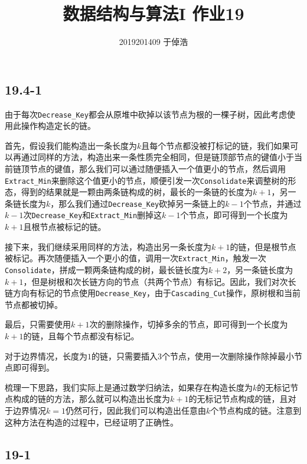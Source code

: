 \documentclass[]{article}
\title{数据结构与算法I 作业19}
\author{2019201409 于倬浩}
\begin{document}
\maketitle

\hypertarget{header-n4}{%
\subsection{19.4-1}\label{header-n4}}

由于每次\texttt{Decrease\_Key}都会从原堆中砍掉以该节点为根的一棵子树，因此考虑使用此操作构造定长的链。

首先，假设我们能构造出一条长度为\(k\)且每个节点都没被打标记的链，我们如果可以再通过同样的方法，构造出来一条性质完全相同，但是链顶部节点的键值小于当前链顶节点的键值，那么我们可以通过随便插入一个值更小的节点，然后调用\texttt{Extract\_Min}来删除这个值更小的节点，顺便引发一次\texttt{Consolidate}来调整树的形态，得到的结果就是一颗由两条链构成的树，最长的一条链的长度为\(k+1\)，另一条链长度为\(k\)，那么我们通过\texttt{Decrease\_Key}砍掉另一条链上的\(k-1\)个节点，并通过\(k-1\)次\texttt{Decrease\_Key}和\texttt{Extract\_Min}删掉这\(k-1\)个节点，即可得到一个长度为\(k+1\)且根节点被标记的链。

接下来，我们继续采用同样的方法，构造出另一条长度为\(k+1\)的链，但是根节点被标记。再次随便插入一个更小的值，调用一次\texttt{Extract\_Min}，触发一次\texttt{Consolidate}，拼成一颗两条链构成的树，最长链长度为\(k+2\)，另一条链长度为\(k+1\)，但是树根和次长链方向的节点（共两个节点）有标记。因此，我们对次长链方向有标记的节点使用\texttt{Decrease\_Key}，由于\texttt{Cascading\_Cut}操作，原树根和当前节点都被切掉。

最后，只需要使用\(k+1\)次的删除操作，切掉多余的节点，即可得到一个长度为\(k+1\)的链，且每个节点都没有标记。

对于边界情况，长度为\(1\)的链，只需要插入\(3\)个节点，使用一次删除操作除掉最小节点即可得到。

梳理一下思路，我们实际上是通过数学归纳法，如果存在构造长度为\(k\)的无标记节点构成的链的方法，那么就可以构造出长度为\(k+1\)的无标记节点构成的链，且对于边界情况\(k=1\)仍然可行，因此我们可以构造出任意由\(k\)个节点构成的链。注意到这种方法在构造的过程中，已经证明了正确性。

\hypertarget{header-n41}{%
\subsection{19-1}\label{header-n41}}
\end{document}
